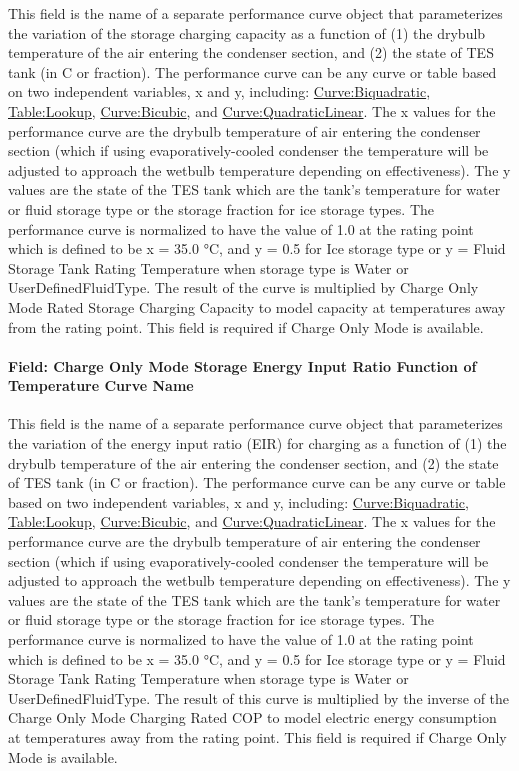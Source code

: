 This field is the name of a separate performance curve object that parameterizes the variation of the storage charging capacity as a function of (1) the drybulb temperature of the air entering the condenser section, and (2) the state of TES tank (in C or fraction). The performance curve can be any curve or table based on two independent variables, x and y, including: \hyperref[curvebiquadratic]{Curve:Biquadratic}, \hyperref[tablelookup]{Table:Lookup}, \hyperref[curvebicubic]{Curve:Bicubic}, and \hyperref[curvequadraticlinear]{Curve:QuadraticLinear}. The x values for the performance curve are the drybulb temperature of air entering the condenser section (which if using evaporatively-cooled condenser the temperature will be adjusted to approach the wetbulb temperature depending on effectiveness). The y values are the state of the TES tank which are the tank's temperature for water or fluid storage type or the storage fraction for ice storage types. The performance curve is normalized to have the value of 1.0 at the rating point which is defined to be x = 35.0 °C, and y = 0.5 for Ice storage type or y = Fluid Storage Tank Rating Temperature when storage type is Water or UserDefinedFluidType. The result of the curve is multiplied by Charge Only Mode Rated Storage Charging Capacity to model capacity at temperatures away from the rating point. This field is required if Charge Only Mode is available.

\paragraph{Field: Charge Only Mode Storage Energy Input Ratio Function of Temperature Curve Name}\label{field-charge-only-mode-storage-energy-input-ratio-function-of-temperature-curve-name}

This field is the name of a separate performance curve object that parameterizes the variation of the energy input ratio (EIR) for charging as a function of (1) the drybulb temperature of the air entering the condenser section, and (2) the state of TES tank (in C or fraction). The performance curve can be any curve or table based on two independent variables, x and y, including: \hyperref[curvebiquadratic]{Curve:Biquadratic}, \hyperref[tablelookup]{Table:Lookup}, \hyperref[curvebicubic]{Curve:Bicubic}, and \hyperref[curvequadraticlinear]{Curve:QuadraticLinear}. The x values for the performance curve are the drybulb temperature of air entering the condenser section (which if using evaporatively-cooled condenser the temperature will be adjusted to approach the wetbulb temperature depending on effectiveness). The y values are the state of the TES tank which are the tank's temperature for water or fluid storage type or the storage fraction for ice storage types. The performance curve is normalized to have the value of 1.0 at the rating point which is defined to be x = 35.0 °C, and y = 0.5 for Ice storage type or y = Fluid Storage Tank Rating Temperature when storage type is Water or UserDefinedFluidType. The result of this curve is multiplied by the inverse of the Charge Only Mode Charging Rated COP to model electric energy consumption at temperatures away from the rating point. This field is required if Charge Only Mode is available.

